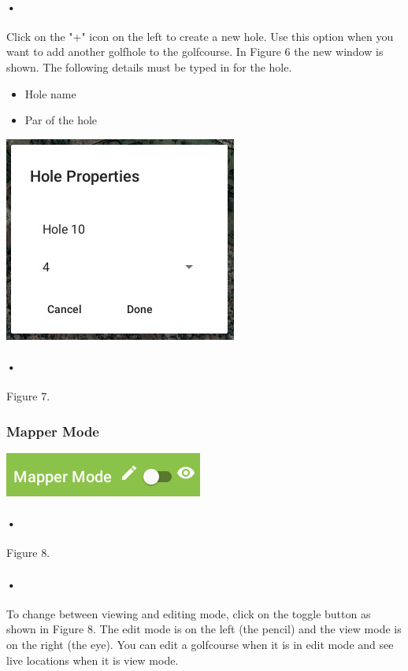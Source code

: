 \documentclass{article}
\begin{document}
    \paragraph{•}
     Click on the "+" icon on the left to create a new hole. Use this option when you want to add another golfhole to the golfcourse. In Figure 6 the new window is shown. The following details must be typed in for the hole.
     
     \begin{itemize}
    		\item Hole name
    		\item Par of the hole
    \end{itemize}
    
    \includegraphics[scale=1.5]{6_hole_popup}
	\paragraph{•}
    Figure 7.
    
    \subsubsection{Mapper Mode}
    \includegraphics[scale=1.5]{7_mapper_mode}
	\paragraph{•}
    Figure 8.
    
    \paragraph{•}
    To change between viewing and editing mode, click on the toggle button as shown in Figure 8. The edit mode is on the left (the pencil) and the view mode is on the right (the eye). You can edit a golfcourse when it is in edit mode and see live locations when it is view mode.
    
\end{document}
